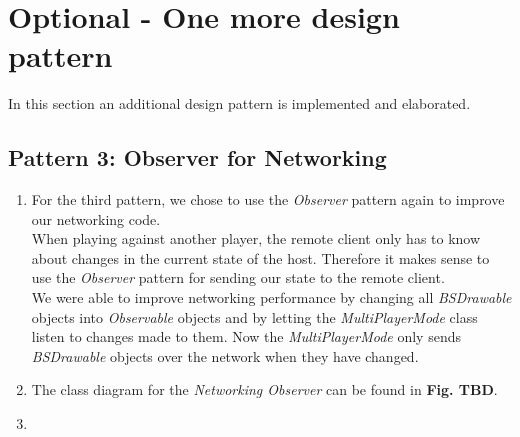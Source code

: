 \documentclass[a4paper,11pt]{article}
\begin{document}
\section{Optional - One more design pattern \\}
In this section an additional design pattern is implemented and elaborated.
\subsection{Pattern 3:  Observer for Networking}
\begin{enumerate}
\item For the third pattern, we chose to use the \textit{Observer} pattern again to improve our networking code. \\
When playing against another player, the remote client only has to know about changes in the current state of the host.
Therefore it makes sense to use the \textit{Observer} pattern for sending our state to the remote client. \\
We were able to improve networking performance by changing all \textit{BSDrawable} objects into \textit{Observable} objects and by letting the \textit{MultiPlayerMode} class listen to changes made to them.
Now the \textit{MultiPlayerMode} only sends \textit{BSDrawable} objects over the network when they have changed.
\item The class diagram for the \textit{Networking Observer} can be found in \textbf{Fig. TBD}. \\
\begin{minipage}{\linewidth}
\end{minipage}
\item
\end{enumerate}
\end{document}
